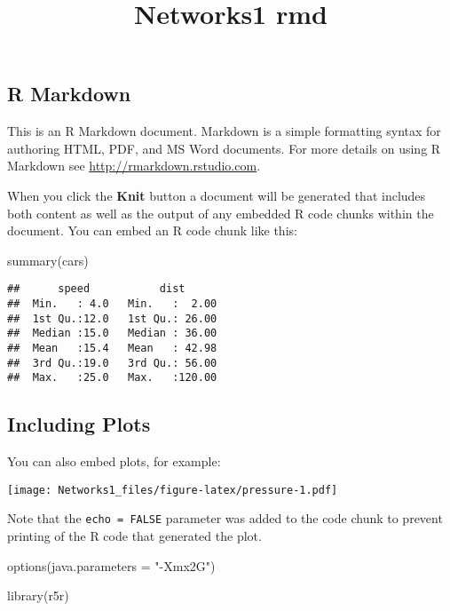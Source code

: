 \documentclass[
]{article}
\title{Networks1 rmd}
\author{}
\date{\vspace{-2.5em}}
\newenvironment{Shaded}{\begin{snugshade}}{\end{snugshade}}
\newcommand{\AttributeTok}[1]{\textcolor[rgb]{0.77,0.63,0.00}{#1}}
\newcommand{\FunctionTok}[1]{\textcolor[rgb]{0.00,0.00,0.00}{#1}}
\newcommand{\NormalTok}[1]{#1}
\newcommand{\StringTok}[1]{\textcolor[rgb]{0.31,0.60,0.02}{#1}}
\begin{document}
\maketitle

\hypertarget{r-markdown}{%
\subsection{R Markdown}\label{r-markdown}}

This is an R Markdown document. Markdown is a simple formatting syntax
for authoring HTML, PDF, and MS Word documents. For more details on
using R Markdown see \url{http://rmarkdown.rstudio.com}.

When you click the \textbf{Knit} button a document will be generated
that includes both content as well as the output of any embedded R code
chunks within the document. You can embed an R code chunk like this:

\begin{Shaded}
\begin{Highlighting}[]
\FunctionTok{summary}\NormalTok{(cars)}
\end{Highlighting}
\end{Shaded}

\begin{verbatim}
##      speed           dist       
##  Min.   : 4.0   Min.   :  2.00  
##  1st Qu.:12.0   1st Qu.: 26.00  
##  Median :15.0   Median : 36.00  
##  Mean   :15.4   Mean   : 42.98  
##  3rd Qu.:19.0   3rd Qu.: 56.00  
##  Max.   :25.0   Max.   :120.00
\end{verbatim}

\hypertarget{including-plots}{%
\subsection{Including Plots}\label{including-plots}}

You can also embed plots, for example:

\texttt{[image: Networks1\_files/figure-latex/pressure-1.pdf]}

Note that the \texttt{echo\ =\ FALSE} parameter was added to the code
chunk to prevent printing of the R code that generated the plot.

\begin{Shaded}
\begin{Highlighting}[]
\FunctionTok{options}\NormalTok{(}\AttributeTok{java.parameters =} \StringTok{"{-}Xmx2G"}\NormalTok{)}

\FunctionTok{library}\NormalTok{(r5r)}
\end{Highlighting}
\end{Shaded}
\end{document}

